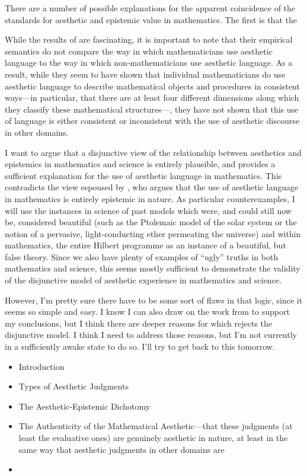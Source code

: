 \documentclass[a4paper,man,natbib]{apa6}
\begin{document}
There are a number of possible explanations for
the apparent coincidence of the standards for aesthetic and epistemic value in mathematics. The first is that the

While the results of \cite{inglis_beauty_2015} are fascinating, it is important to note that their empirical
semantics do not compare the way in which mathematicians use aesthetic language to the way in which non-mathematicians
use aesthetic language. As a result, while they seem to have shown that individual mathematicians do use aesthetic
language to describe mathematical objects and procedures in consistent ways---in particular, that there are
at least four different dimensions along which they classify these mathematical structures---, they have not shown that this use
of language is either consistent or inconsistent with the use of aesthetic discourse in other domains. 

I want to argue that a disjunctive view of the relationship between aesthetics and epistemics in mathematics
and science is entirely plausible, and provides a sufficient explanation for the use of aesthetic language
in mathematics. This contradicts the view espoused by \cite{todd_unmasking_2008}, who argues that the
use of aesthetic language in mathematics is entirely epistemic in nature. As particular counterexamples,
I will use the instances in science of past models which were, and could still now be, considered beautiful (such
as the Ptolemaic model of the solar system or the notion of a pervasive, light-conducting ether permeating the
universe) and within mathematics, the entire Hilbert programme as an instance of a beautiful, but false theory.
Since we also have plenty of examples of ``ugly'' truths in both mathematics and science, this seems mostly sufficient
to demonstrate the validity of the disjunctive model of aesthetic experience in mathematics and science.

However, I'm pretty sure there have to be some sort of flaws in that logic, since it seems so simple and easy. I know
I can also draw on the work from \cite{inglis_beauty_2015} to support my conclusions, but I think there are deeper
reasons for which \cite{todd_unmasking_2008} rejects the disjunctive model. I think I need to address those reasons,
but I'm not currently in a sufficiently awake state to do so. I'll try to get back to this tomorrow.

\begin{itemize}
      \item Introduction
      \item Types of Aesthetic Judgments
      \item The Aesthetic-Epistemic Dichotomy

      \item The Authenticity of the Mathematical Aesthetic---that these judgments (at least the evaluative ones) are
      genuinely aesthetic in nature, at least in the same way that aesthetic judgments in other domains are
      \item 
\end{itemize}



\end{document}

